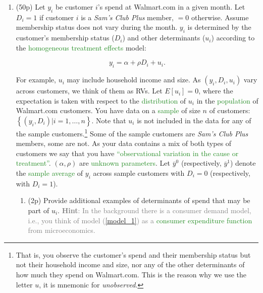 \documentclass{article}
\begin{document}
\begin{enumerate}[label=\textbf{Q\arabic{enumi}}.,ref=Q\arabic{enumi}, wide=0pt, itemsep=1em, topsep=5pt]


    \item (50p) Let $y_{i}$ be customer $i$'s spend at Walmart.com in a given month. Let $D_{i}=1$ if customer $i$ is a \textit{Sam's Club Plus} member, $=0$ otherwise. Assume membership status does not vary during the month. $y_{i}$ is determined by the customer's membership status ($D_{i}$) and other determinants ($u_{i}$) according to the \textcolor{ForestGreen}{homogeneous treatment effects} model:\label{item:q1}
    
    \begin{equation} \label{model_1}
    y_{i}=\alpha +\rho D_{i}+u_{i}.
    \end{equation} 
    
    For example, $u_{i}$ may include household income and size. As $\left( y_{i},D_{i},u _{i}\right) $ vary across customers, we think of them as RVs. Let $E\left[ u_{i}\right] =0$, where the expectation is taken with respect to the \textcolor{ForestGreen}{distribution} of $u_{i}$ in the \textcolor{ForestGreen}{population} of Walmart.com customers. You have data on a \textcolor{ForestGreen}{sample} of size $n$ of customers: $\left\{ \left( y_{i},D_{i}\right) |i=1,\ldots,n\right\} $. Note that $u_{i}$ is not included in the data for any of the sample customers.\footnote{That is, you observe the customer's spend and their membership status but not their household income and size, nor any of the other determinants of how much they spend on Walmart.com. This is the reason why we use the letter $u$, it is mnemonic for \textit{unobserved}.} Some of the sample customers are \textit{Sam's Club Plus} members, some are not. As your data contains a mix of both types of customers we say that you  have \textcolor{ForestGreen}{``observational variation in the cause or treatment''}. $\left( \alpha ,\rho \right) $ are \textcolor{ForestGreen}{unknown parameters}. Let $\overline{y}^{0}$ (respectively, $\overline{y}^{1}$) denote the \textcolor{ForestGreen}{sample average} of $y_{i}$ across sample customers with $D_{i}=0$ (respectively, with $D_{i}=1$).
    
    \begin{enumerate}
        \item (2p) Provide additional examples of determinants of spend that may be part of $u _{i}$. \textcolor{gray}{\textbf{Hint}: In the background there is a consumer demand model, i.e., you think of model (\ref{model_1}) as a \textcolor{ForestGreen}{consumer expenditure function} from microeconomics.}
        

\end{enumerate}
\end{enumerate}
\end{document}
